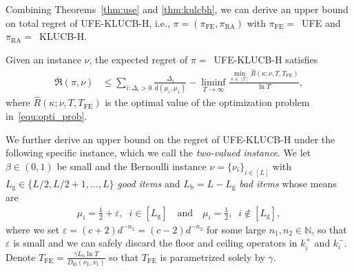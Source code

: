 \documentclass[twoside,11pt]{article}
\newcommand{\kl}{D_{\mathrm{kl}}}
\newcommand{\rmb}{\mathrm{b}}
\newcommand{\rmd}{\mathrm{d}}
\newcommand{\rmg}{\mathrm{g}}
\newcommand{\bbN}{\mathbb{N}}
\newcommand{\Tfe}{T_{\mathrm{FE}}}
\newcommand{\FE}{\textrm{FE}}
\newcommand{\RA}{\textrm{RA}}
\newcommand{\ouralg}{\textsc{UFE-KLUCB-H}}
\newcommand{\ouralgfe}{\textsc{UFE}}
\newcommand{\klucbh}{\textsc{KLUCB-H}}
\begin{document}
Combining Theorems~\ref{thm:use} and \ref{thm:kulcbh}, we can derive an upper bound on total regret of \ouralg{}, i.e., $\pi=(\pi_{\FE},\pi_{\RA})$ with $\pi_{\FE}=$\ \ouralgfe{} and $\pi_{\RA}=$\ \klucbh{}.
\begin{corollary}
    Given an instance $\nu$,  
    the expected regret of $\pi =$\ \ouralg{} satisfies
    \begin{align}
         \overline{\mathfrak{R}}(\pi,\nu)&\le \sum_{i:\Delta_i>0} 
           \frac{\Delta_{i}}{\rmd(\mu_i,\mu_1)}  
         -
         \liminf_{T\to\infty}
         \frac{\min_{\kappa\in[T]} \hat{R}(\kappa;\nu,T,\Tfe)}{\ln T},
    \end{align}
    where $\hat{R}(\kappa;\nu,T,\Tfe)$ is the optimal value of the optimization problem in~\eqref{equ:opti_prob}.
\end{corollary}
We further derive an  upper bound on the regret of \ouralg{} under the following specific instance, which we call the {\em two-valued instance}.
We let $\beta\in(0,1)$ be small and the Bernoulli instance $\nu=\{\nu_i\}_{i\in[L]}$ with $L_{\rmg}\in \{L/2,L/2+1,\ldots,L\}$ {\em good items} and $L_{\rmb}=L-L_{\rmg}$ {\em bad items} whose means are
\begin{align}\label{equ:two_value_instance}
    \!\!\mu_i = \frac{1}{2}+\varepsilon, \;\; i\in[L_{\rmg}]
    \quad\mbox{and}\quad
    \mu_i = \frac{1}{2},\;\; i\notin [L_{\rmg}],
\end{align}
where we set $\varepsilon=(c+2)d^{-n_1}=(c-2)d^{-n_2}$ for some large $n_1,n_2\in\bbN$, so that $\varepsilon$ is small and we can safely discard the floor and ceiling operators in $k_i^+$ and $k_i^-$.
Denote $\Tfe = \frac{\gamma L_{\rmb}\ln T}{\kl(\nu_L,\nu_1)}$ so that $\Tfe$ is parametrized solely by $\gamma$.
\end{document}
